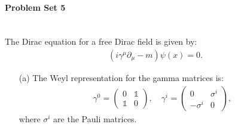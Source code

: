 \paragraph*{Problem Set 5} %
\\
The Dirac equation for a free Dirac field is given by:
    \begin{align}
        (i\gamma^\mu \partial_\mu - m)\psi(x) = 0.\label{eq:dirac-equation}
    \end{align}
\begin{enumerate}
    \item [(a)] The Weyl representation for the gamma matrices is:
    \begin{align}
        \gamma^0 =
        \begin{pmatrix}
        0 & \mathds{1} \\
        \mathds{1} & 0
        \end{pmatrix}
        ,\quad \gamma^i =
        \begin{pmatrix}
        0 & \sigma^i \\
        -\sigma^i & 0
        \end{pmatrix}
        ,
    \end{align}
    where $\sigma^i$ are the Pauli matrices.
    

\end{enumerate}
